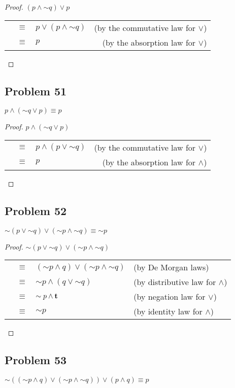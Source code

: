 \documentclass[14pt]{extarticle}
\newcommand{\true}{{\bf t}}
\begin{document}
\begin{proof}
$(p \wedge {\sim q}) \vee p$

\begin{tabular}{rclr}
 & $\equiv$ & $p \vee (p \wedge {\sim q})$ & (by the commutative law for $\vee$) \\
 & $\equiv$ & $p$ & (by the absorption law for $\vee$) \\
\end{tabular}
\end{proof}

\subsection{Problem 51}
$p \wedge ({\sim q} \vee p) \equiv p$

\begin{proof}
$p \wedge ({\sim q} \vee p)$

\begin{tabular}{rclr}
 & $\equiv$ & $p \wedge (p \vee {\sim q})$ & (by the commutative law for $\vee$) \\
 & $\equiv$ & $p$ & (by the absorption law for $\wedge$) \\
\end{tabular}
\end{proof}

\subsection{Problem 52}
${\sim (p \vee {\sim q})} \vee ({\sim p} \wedge {\sim q}) \equiv {\sim p}$

\begin{proof}
${\sim (p \vee {\sim q})} \vee ({\sim p} \wedge {\sim q})$ 

\begin{tabular}{rcll}
 & $\equiv$ & $({\sim p} \wedge q) \vee ({\sim p} \wedge {\sim q})$ & (by De Morgan laws) \\
 & $\equiv$ & ${\sim p} \wedge (q \vee {\sim q})$ & (by distributive law for $\wedge$) \\
 & $\equiv$ & ${\sim p} \wedge \true$ & (by negation law for $\vee$) \\
 & $\equiv$ & ${\sim p}$ & (by identity law for $\wedge$) \\
\end{tabular}
\end{proof}

\subsection{Problem 53}
$\sim(({\sim p} \wedge q) \vee ({\sim p} \wedge {\sim q})) \vee (p \wedge q) \equiv p$
\end{document}
